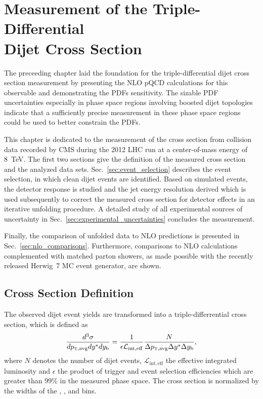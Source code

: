 
\chapter[Measurement of the Triple-Differential Dijet Cross Section]{Measurement
of the Triple-Differential\\ Dijet Cross Section}
\label{sec:measurement}

The preceeding chapter laid the foundation for the triple-differential dijet
cross section measurement by presenting the NLO pQCD calculations for this
observable and demonstrating the PDFs sensitivity. The sizable PDF uncertainties
especially in phase space regions involving boosted dijet topologies indicate
that a sufficiently precise measurement in these phase space regions could be
used to better constrain the PDFs. 

This chapter is dedicated to the measurement of the cross section from collision
data recorded by CMS during the 2012 LHC run at a center-of-mass energy of
\SI{8}{\TeV}. The first two sections give the definition of the measured cross
section and the analyzed data sets. Sec.~\ref{sec:event_selection} describes the
event selection, in which clean dijet events are identified. Based on simulated
events, the detector response is studied and the jet energy resolution derived
which is used subsequently to correct the measured cross section for detector
effects in an iterative unfolding procedure. A detailed study of all
experimental sources of uncertainty in Sec.~\ref{sec:experimental_uncertainties}
concludes the measurement.

Finally, the comparison of unfolded data to NLO predictions is presented in
Sec.~\ref{sec:nlo_comparisons}. Furthermore, comparisons to NLO calculations
complemented with matched parton showers, as made possible with the recently
released Herwig~7 MC event generator, are shown.
~

\section{Cross Section Definition}

The observed dijet event yields are transformed into a triple-differrential
cross section, which is defined as
%
\begin{equation*}
    \frac{d^3 \sigma}{d \ptavg d \ystar d \yboost} = \frac{1}{\epsilon
        \mathcal{L}_{\mathrm{int, eff}}} \frac{N}{\Delta \ptavg \Delta \ystar
        \Delta \yboost},
\end{equation*}
%
where $N$ denotes the number of dijet events, $\mathcal{L}_{\mathrm{int, eff}}$
the effective integrated luminosity and $\epsilon$ the product of trigger and
event selection efficiencies which are greater than 99\% in the measured phase
space. The cross section is normalized by the widths of the \ptavg, \ystar, and
\yboost bins. 

